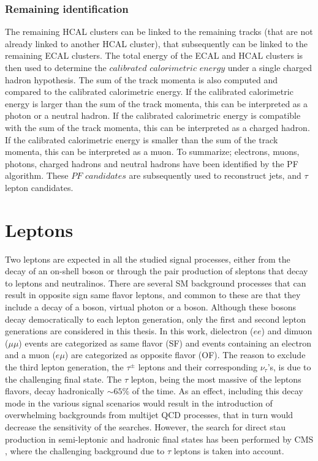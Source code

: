 \subsubsection*{Remaining identification}
\noindent\justify
The remaining HCAL clusters can be linked to the remaining tracks (that are not already linked to another HCAL cluster), that subsequently can be linked to the remaining ECAL clusters. 
The total energy of the ECAL and HCAL clusters is then used to determine the $calibrated$ $calorimetric$ $energy$ under a single charged hadron hypothesis. 
The sum of the track momenta is also computed and compared to the calibrated calorimetric energy. 
If the calibrated calorimetric energy is larger than the sum of the track momenta, this can be interpreted as a photon or a neutral hadron. 
If the calibrated calorimetric energy is compatible with the sum of the track momenta, this can be interpreted as a charged hadron. 
If the calibrated calorimetric energy is smaller than the sum of the track momenta, this can be interpreted as a muon. 
To summarize; electrons, muons, photons, charged hadrons and neutral hadrons have been identified by the PF algorithm. 
These $PF$ $candidates$ are subsequently used to reconstruct jets, \ptmiss and $\tau$ lepton candidates.   
\section{Leptons}
\noindent\justify
Two leptons are expected in all the studied signal processes, either from the decay of an on-shell \PZ boson or through the pair production of sleptons that decay to leptons and neutralinos. 
There are several SM background processes that can result in opposite sign same flavor leptons, and common to these are that they include a decay of a \PZ boson, virtual photon or a \PW boson. 
Although these bosons decay democratically to each lepton generation, only the first and second lepton generations are considered in this thesis. 
In this work, dielectron ($ee$) and dimuon ($\mu\mu$) events are categorized as same flavor (SF) and events containing an electron and a muon ($e\mu$) are categorized as opposite flavor (OF). 
The reason to exclude the third lepton generation, the $\tau^{\pm}$ leptons and their corresponding $\nu_{\tau}$'s, is due to the challenging final state. 
The $\tau$ lepton, being the most massive of the leptons flavors, decay hadronically $\sim65\%$ of the time. 
As an effect, including this decay mode in the various signal scenarios would result in the introduction of overwhelming backgrounds from multijet QCD processes, that in turn would decrease the sensitivity of the searches. 
However, the search for direct stau production in semi-leptonic and hadronic final states has been performed by CMS \cite{CMS-PAS-SUS-17-002,Sirunyan:2018vig}, where the challenging background due to $\tau$ leptons is taken into account.  
